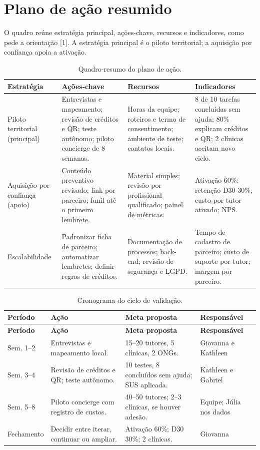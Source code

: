 \section{Plano de ação resumido}

O quadro reúne estratégia principal, ações-chave, recursos e indicadores, como pede a orientação [1]. A estratégia principal é o piloto territorial; a aquisição por confiança apoia a ativação.

\begin{table}[H]
\centering\small
\caption{Quadro-resumo do plano de ação.}
\begin{tabularx}{\textwidth}{P{2.4cm}YYY}
\toprule
\textbf{Estratégia} & \textbf{Ações-chave} & \textbf{Recursos} & \textbf{Indicadores} \\
\midrule
Piloto territorial (principal) & Entrevistas e mapeamento; revisão de créditos e QR; teste autônomo; piloto concierge de 8 semanas. & Horas da equipe; roteiros e termo de consentimento; ambiente de teste; contatos locais. & 8 de 10 tarefas concluídas sem ajuda; 80\% explicam créditos e QR; 2 clínicas aceitam novo ciclo. \\
Aquisição por confiança (apoio) & Conteúdo preventivo revisado; link por parceiro; funil até o primeiro lembrete. & Material simples; revisão por profissional qualificado; painel de métricas. & Ativação 60\%; retenção D30 30\%; custo por tutor ativado; NPS. \\
Escalabilidade & Padronizar ficha de parceiro; automatizar lembretes; definir regras de créditos. & Documentação de processos; back-end; revisão de segurança e LGPD. & Tempo de cadastro de parceiro; custo de suporte por tutor; margem por parceiro. \\
\bottomrule
\end{tabularx}
\end{table}

\begin{longtable}{P{1.8cm}P{4.6cm}P{4.2cm}P{2.6cm}}
\caption{Cronograma do ciclo de validação.}\label{tab:plano}\\
\toprule
\textbf{Período} & \textbf{Ação} & \textbf{Meta proposta} & \textbf{Responsável} \\
\midrule
\endfirsthead
\toprule
\textbf{Período} & \textbf{Ação} & \textbf{Meta proposta} & \textbf{Responsável} \\
\midrule
\endhead
Sem. 1--2 & Entrevistas e mapeamento local. & 15--20 tutores, 5 clínicas, 2 ONGs. & Giovanna e Kathleen \\
Sem. 3--4 & Revisão de créditos e QR; teste autônomo. & 10 testes, 8 concluídos sem ajuda; SUS aplicada. & Kathleen e Gabriel \\
Sem. 5--8 & Piloto concierge com registro de custos. & 40--50 tutores; 2--3 clínicas, se houver adesão. & Equipe; Júlia nos dados \\
Fechamento & Decidir entre iterar, continuar ou ampliar. & Ativação 60\%; D30 30\%; 2 clínicas. & Giovanna \\
\bottomrule
\end{longtable}

